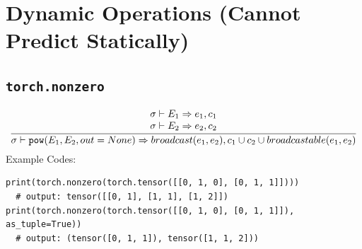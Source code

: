 \documentclass{article}
\begin{document}
\section*{Dynamic Operations (Cannot Predict Statically)}
\subsection*{\texttt{torch.nonzero}}
\begin{align*}
  \frac
  {
    \begin{array}{l}
      \sigma \vdash E_1 \Rightarrow e_1, c_1 \\
      \sigma \vdash E_2 \Rightarrow e_2, c_2 \\
    \end{array}
  }
  {
    \sigma \vdash \mathtt{pow(}E_1, E_2, out=None\mathtt{)} \Rightarrow broadcast(e_1, e_2),
      c_1 \cup c_2 \cup broadcastable(e_1, e_2)
  }
\end{align*}
Example Codes:
\begin{Verbatim}[tabsize=4,xleftmargin=2em]
print(torch.nonzero(torch.tensor([[0, 1, 0], [0, 1, 1]])))
  # output: tensor([[0, 1], [1, 1], [1, 2]])
print(torch.nonzero(torch.tensor([[0, 1, 0], [0, 1, 1]]), as_tuple=True))
  # output: (tensor([0, 1, 1]), tensor([1, 1, 2]))
\end{Verbatim}
\end{document}
